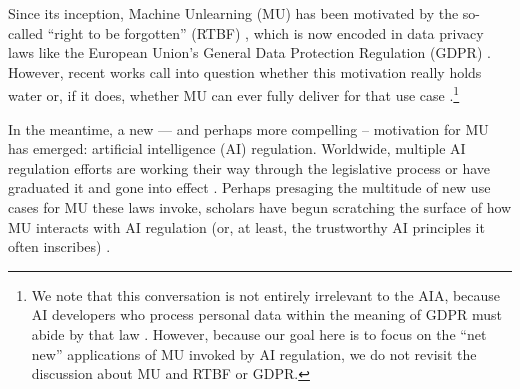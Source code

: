 Since its inception, Machine Unlearning (MU) has been motivated by the so-called ``right to be forgotten'' (RTBF) \citep{CaoYang2015}, which is now encoded in data privacy laws like the European Union's General Data Protection Regulation (GDPR) \citep[Art. 17]{european_union_gdpr_2016}. 
However, recent works call into question whether this motivation really holds water \citep{JULIUSSEN2023105885} or, if it does, whether MU can ever fully deliver for that use case \citep{cooper2024machineunlearningdoesntthink}.\footnote{We note that this conversation is not entirely irrelevant to the AIA, because AI developers who process personal data within the meaning of GDPR must abide by that law  
\citep{mazzini2023proposal}. However, because our goal here is to focus on the ``net new'' applications of MU invoked by AI regulation, we do not revisit the discussion about MU and RTBF or GDPR.}

In the meantime, a new --- and perhaps more compelling -- motivation for MU has emerged: artificial intelligence (AI) regulation. Worldwide, multiple AI regulation efforts are working their way through the legislative process \citep{BELLI2023105767, Beardwood+2024+129+137, Zhang+2024+162+165} or have graduated it and gone into effect \citep{european_union_ai_act_2024, colorado_ai_act_2024}. Perhaps presaging the multitude of new use cases for MU these laws invoke, scholars have begun scratching the surface of how MU interacts with AI regulation (or, at least, the trustworthy AI principles it often inscribes) \citep{hine_supporting_2024, DIAZRODRIGUEZ2023101896, li2024wmdpbenchmarkmeasuringreducing}.  


